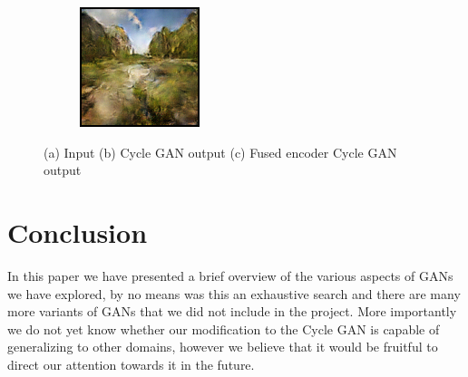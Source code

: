 \documentclass{article}
\begin{document}
\begin{figure}[H]
\begin{subfigure}{.165\textwidth}
        \includegraphics[width=0.75\linewidth]{output_2_modified_cycle_gan.png}
        \caption{}
    \end{subfigure}
    
    \caption{(a) Input (b) Cycle GAN output (c) Fused encoder Cycle GAN output}
    \label{fig:my_label}
\end{figure}

\section{Conclusion}
In this paper we have presented a brief overview of the various aspects of GANs we have explored, by no means was this an exhaustive search and there are many more variants of GANs that we did not include in the project. More importantly we do not yet know whether our modification to the Cycle GAN is capable of generalizing to other domains, however we believe that it would be fruitful to direct our attention towards it in the future.




\end{document}
